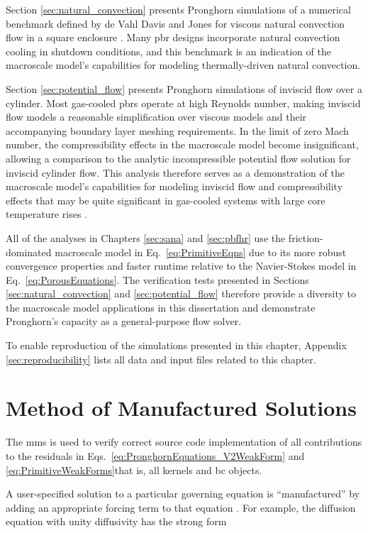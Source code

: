 Section \ref{sec:natural_convection} presents Pronghorn simulations of a numerical benchmark defined by de Vahl Davis and Jones for viscous natural convection flow in a square enclosure \cite{davis}. Many \gls{pbr} designs incorporate natural convection cooling in shutdown conditions, and this benchmark is an indication of the macroscale model's capabilities for modeling thermally-driven natural convection.

Section \ref{sec:potential_flow} presents Pronghorn simulations of inviscid flow over a cylinder. Most gas-cooled \glspl{pbr} operate at high Reynolds number, making inviscid flow models a reasonable simplification over viscous models and their accompanying boundary layer meshing requirements. In the limit of zero Mach number, the compressibility effects in the macroscale model become insignificant, allowing a comparison to the analytic incompressible potential flow solution for inviscid cylinder flow. This analysis therefore serves as a demonstration of the macroscale model's capabilities for modeling inviscid flow and compressibility effects that may be quite significant in gas-cooled systems with large core temperature rises \cite{martineau}.

All of the analyses in Chapters \ref{sec:sana} and \ref{sec:pbfhr} use the friction-dominated macroscale model in Eq.\ \eqref{eq:PrimitiveEqns} due to its more robust convergence properties and faster runtime relative to the Navier-Stokes model in Eq.\ \eqref{eq:PorousEquations}. The verification tests presented in Sections \ref{sec:natural_convection} and \ref{sec:potential_flow} therefore provide a diversity to the macroscale model applications in this dissertation and demonstrate Pronghorn's capacity as a general-purpose flow solver.

To enable reproduction of the simulations presented in this chapter, Appendix \ref{sec:reproducibility} lists all data and input files related to this chapter.

\section{Method of Manufactured Solutions}
\label{sec:mms}

The \gls{mms} is used to verify correct source code implementation of all contributions to the residuals in Eqs.\ \eqref{eq:PronghornEquations_V2WeakForm} and \eqref{eq:PrimitiveWeakForms}\mdash that is, all kernels and \gls{bc} objects.

A user-specified solution to a particular governing equation is ``manufactured'' by adding an appropriate forcing term to that equation \cite{roache}. For example, the diffusion equation with unity diffusivity has the strong form

